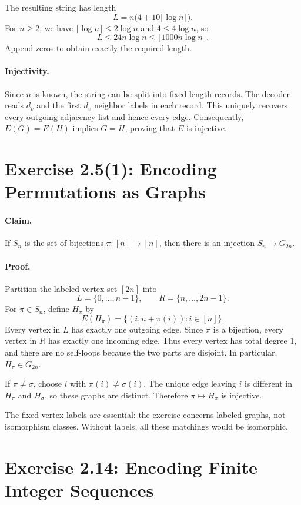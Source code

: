 \documentclass[UTF8,fontset=fandol,11pt,a4paper]{ctexart}
\begin{document}
The resulting string has length
\[
 L=n\bigl(4+10\lceil\log n\rceil\bigr).
\]
For $n\ge2$, we have $\lceil\log n\rceil\le2\log n$ and
$4\le4\log n$, so
\[
 L\le24n\log n\le\lfloor1000n\log n\rfloor.
\]
Append zeros to obtain exactly the required length.

\paragraph{Injectivity.}
Since $n$ is known, the string can be split into fixed-length records.
The decoder reads $d_v$ and the first $d_v$ neighbor labels in each record.
This uniquely recovers every outgoing adjacency list and hence every edge.
Consequently, $E(G)=E(H)$ implies $G=H$, proving that $E$ is injective.

\section{Exercise 2.5(1): Encoding Permutations as Graphs}

\paragraph{Claim.}
If $S_n$ is the set of bijections $\pi:[n]\to[n]$, then there is an
injection $S_n\to G_{2n}$.

\paragraph{Proof.}
Partition the labeled vertex set $[2n]$ into
\[
 L=\{0,\ldots,n-1\},\qquad R=\{n,\ldots,2n-1\}.
\]
For $\pi\in S_n$, define $H_\pi$ by
\[
 E(H_\pi)=\{(i,n+\pi(i)):i\in[n]\}.
\]
Every vertex in $L$ has exactly one outgoing edge. Since $\pi$ is a
bijection, every vertex in $R$ has exactly one incoming edge.
Thus every vertex has total degree $1$, and there are no self-loops
because the two parts are disjoint. In particular, $H_\pi\in G_{2n}$.

If $\pi\ne\sigma$, choose $i$ with $\pi(i)\ne\sigma(i)$.
The unique edge leaving $i$ is different in $H_\pi$ and $H_\sigma$,
so these graphs are distinct. Therefore $\pi\mapsto H_\pi$ is injective.

The fixed vertex labels are essential: the exercise concerns labeled
graphs, not isomorphism classes. Without labels, all these matchings
would be isomorphic.

\section{Exercise 2.14: Encoding Finite Integer Sequences}
\end{document}
